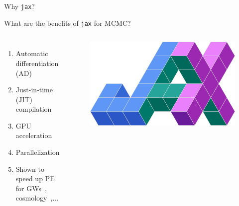 \documentclass[usenames,dvipsnames,t]{beamer}
\begin{document}
  
  \begin{frame}{Why \texttt{jax}?}
  
    \def\x{4mm}
  
    \begin{tcolorbox}[colback=blue!10, boxrule=0pt]
      What are the benefits of \texttt{jax} for MCMC?
    \end{tcolorbox}
  
  \vspace{3mm}
  
  \begin{columns}
    \begin{enumerate}
      \item Automatic differentiation (AD)
      
      \vspace{\x}
  
      \item Just-in-time (JIT) compilation
      
      \vspace{\x}
      
      \item GPU acceleration
      
      \vspace{\x}
      
      \item Parallelization
      
      \vspace{\x}
      
      \item Shown to speed up PE for GWs~\cite{wong2023fast}, cosmology~\cite{piras2023cosmopower},...
      
      
    \end{enumerate}
    \begin{figure}
      \includegraphics[width=\textwidth]{Figures/jax.png}
    \end{figure}
  \end{columns}
    
  \end{frame}
\end{document}

